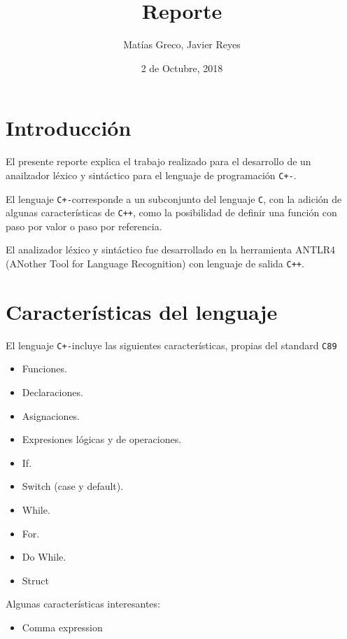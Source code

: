\documentclass[12pt]{article}
\newcommand{\Cp}{\texttt{C+-}}
\newcommand{\C}{\texttt{C}}
\newcommand{\Cpp}{\texttt{C++}}
\begin{document}

\title{Reporte}
\author{Mat\'ias Greco, Javier Reyes}
\date{2 de Octubre, 2018}
\maketitle

\section*{Introducci\'on}
El presente reporte explica el trabajo realizado para el desarrollo de un anailzador l\'exico y sint\'actico para el lenguaje de programaci\'on \Cp.

El lenguaje \Cp corresponde a un subconjunto del lenguaje \C, con la adici\'on de algunas caracter\'isticas de \Cpp, como la posibilidad de definir una funci\'on con paso por valor o paso por referencia.

El analizador l\'exico y sint\'actico fue desarrollado en la herramienta ANTLR4 (ANother Tool for Language Recognition) con lenguaje de salida \Cpp.


\section*{Caracter\'isticas del lenguaje}

El lenguaje \Cp incluye las siguientes caracter\'isticas, propias del standard \texttt{C89}
\begin{itemize}
    \item Funciones.
    \item Declaraciones.
    \item Asignaciones.
    \item Expresiones l\'ogicas y de operaciones.
    \item If.
    \item Switch (case y default).
    \item While.
    \item For.
    \item Do While.
    \item Struct
\end{itemize}

Algunas caracter\'isticas interesantes:
\begin{itemize}
    \item Comma expression
\end{itemize}
\end{document}
